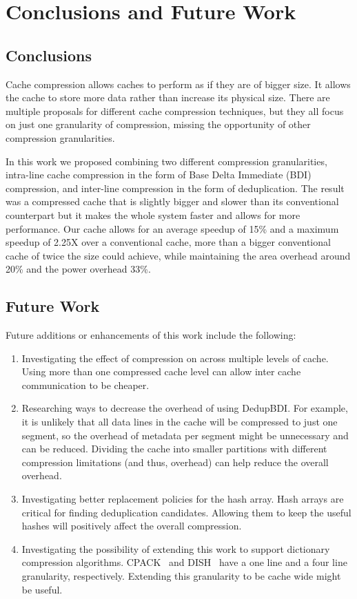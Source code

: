 
\chapter{Conclusions and Future Work}
\label{ch:Conclusions}
\section{Conclusions}
Cache compression allows caches to perform as if they are of bigger size. It allows the cache to store more data rather than increase its physical size. There are multiple proposals for different cache compression techniques, but they all focus on just one granularity of compression, missing the opportunity of other compression granularities.\par
In this work we proposed combining two different compression granularities, intra-line cache compression in the form of Base Delta Immediate (BDI) compression, and inter-line compression in the form of deduplication. The result was a compressed cache that is slightly bigger and slower than its conventional counterpart but it makes the whole system faster and allows for more performance. Our cache allows for an average speedup of 15\% and a maximum speedup of 2.25X over a conventional cache, more than a bigger conventional cache of twice the size could achieve, while maintaining the area overhead around 20\% and the power overhead 33\%.\par
\section{Future Work}
Future additions or enhancements of this work include the following:
\begin{enumerate}
    \item Investigating the effect of compression on across multiple levels of cache. Using more than one compressed cache level can allow inter cache communication to be cheaper.
    \item Researching ways to decrease the overhead of using DedupBDI. For example, it is unlikely that all data lines in the cache will be compressed to just one segment, so the overhead of metadata per segment might be unnecessary and can be reduced. Dividing the cache into smaller partitions with different compression limitations (and thus, overhead) can help reduce the overall overhead.
    \item Investigating better replacement policies for the hash array. Hash arrays are critical for finding deduplication candidates. Allowing them to keep the useful hashes will positively affect the overall compression.
    \item Investigating the possibility of extending this work to support dictionary compression algorithms. CPACK~\cite{cpack} and DISH~\cite{dish} have a one line and a four line granularity, respectively. Extending this granularity to be cache wide might be useful.
\end{enumerate}